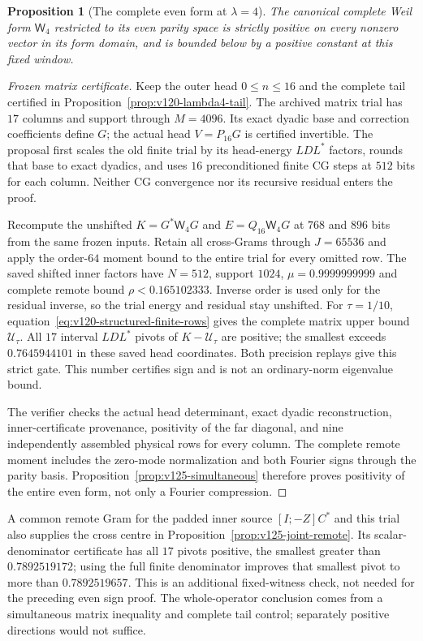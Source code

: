 \documentclass[11pt]{article}
\newtheorem{proposition}[theorem]{Proposition}
\theoremstyle{remark}
\begin{document}
\begin{proposition}[The complete even form at $\lambda=4$]
\label{prop:v125-even-complete}
The canonical complete Weil form $\mathsf W_4$ restricted to its
even parity space is strictly positive on every nonzero vector
in its form domain, and is bounded below by a positive constant
at this fixed window.
\end{proposition}
\begin{proof}[Frozen matrix certificate]
Keep the outer head $0\le n\le16$ and the complete tail certified
in Proposition~\ref{prop:v120-lambda4-tail}.  The archived matrix
trial has $17$ columns and support through $M=4096$.  Its exact
dyadic base and correction coefficients define $G$; the actual
head $V=P_{16}G$ is certified invertible.  The proposal first scales
the old finite trial by its head-energy $LDL^*$ factors, rounds
that base to exact dyadics, and uses $16$ preconditioned finite CG
steps at $512$ bits for each column.  Neither CG convergence nor
its recursive residual enters the proof.

Recompute the unshifted $K=G^*\mathsf W_4G$ and
$E=Q_{16}\mathsf W_4G$ at $768$ and $896$ bits from the same
frozen inputs.  Retain all cross-Grams through $J=65536$ and apply
the order-$64$ moment bound to the entire trial for every omitted
row.  The saved shifted inner factors have $N=512$, support $1024$,
$\mu=0.9999999999$ and complete remote bound
$\rho<0.165102333$.  Inverse order is used only for the residual
inverse, so the trial energy and residual stay unshifted.
For $\tau=1/10$, equation~\eqref{eq:v120-structured-finite-rows}
gives the complete matrix upper bound $\mathcal U_\tau$.
All $17$ interval $LDL^*$ pivots of $K-\mathcal U_\tau$ are positive;
the smallest exceeds $0.7645944101$ in these saved head coordinates.
Both precision replays give this strict gate.  This number certifies
sign and is not an ordinary-norm eigenvalue bound.

The verifier checks the actual head determinant, exact dyadic
reconstruction, inner-certificate provenance, positivity of the
far diagonal, and nine independently assembled physical rows for
every column.  The complete remote moment includes the zero-mode
normalization and both Fourier signs through the parity basis.
Proposition~\ref{prop:v125-simultaneous} therefore proves positivity
of the entire even form, not only a Fourier compression.
\end{proof}

A common remote Gram for the padded inner source $[I;-Z]C^*$ and
this trial also supplies the cross centre in
Proposition~\ref{prop:v125-joint-remote}.  Its scalar-denominator
certificate has all $17$ pivots positive, the smallest greater than
$0.7892519172$; using the full finite denominator improves that
smallest pivot to more than $0.7892519657$.  This is an additional
fixed-witness check, not needed for the preceding even sign proof.
The whole-operator conclusion comes from a simultaneous matrix
inequality and complete tail control; separately positive directions
would not suffice.
\end{document}
